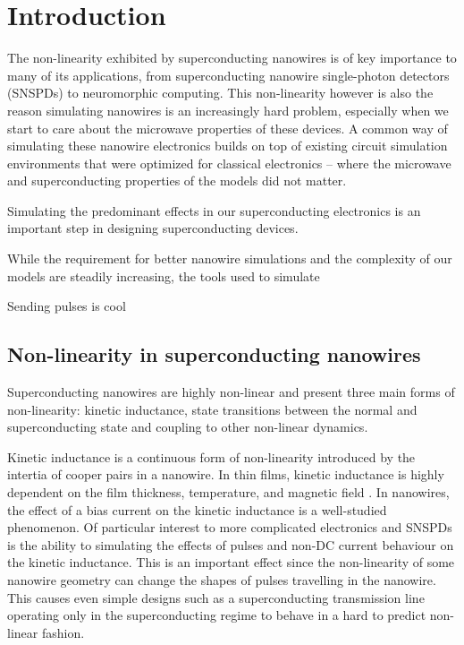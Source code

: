 \documentclass{article}
\begin{document}


\tableofcontents

\newpage


\section{Introduction}

The non-linearity exhibited by superconducting nanowires is of key importance to many of its applications,
from superconducting nanowire single-photon detectors (SNSPDs) to neuromorphic computing. This non-linearity
however is also the reason simulating nanowires is an increasingly hard problem, especially when we start
to care about the microwave properties of these devices. A common way of simulating these nanowire electronics
builds on top of existing circuit simulation environments that were optimized for classical electronics -- where
the microwave and superconducting properties of the models did not matter. 

Simulating the predominant effects in our superconducting electronics is an important step in designing
superconducting devices.

While the requirement for better nanowire simulations and the complexity of our models are steadily increasing,
the tools used to simulate

Sending pulses is cool

\subsection{Non-linearity in superconducting nanowires}

Superconducting nanowires are highly non-linear and present three main forms of non-linearity:
kinetic inductance, state transitions between the normal and superconducting state and
coupling to other non-linear dynamics.

Kinetic inductance is a continuous form of non-linearity introduced by the intertia of cooper
pairs in a nanowire. In thin films, kinetic inductance is highly dependent on the film thickness,
temperature, and magnetic field \cite{dizhu-thesis}. In nanowires, the effect of a bias current
on the kinetic inductance is a well-studied phenomenon. Of particular interest to more complicated
electronics and SNSPDs is the ability to simulating the effects of pulses and non-DC current behaviour
on the kinetic inductance. This is an important effect since the non-linearity of some nanowire 
geometry can change the shapes of pulses travelling in the nanowire. This causes even simple designs 
such as a superconducting transmission line operating only in the superconducting regime to 
behave in a hard to predict non-linear fashion. 
\end{document}
